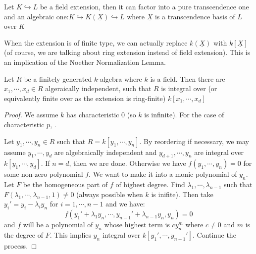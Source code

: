\documentclass{note-eng}
\begin{document}
\begin{corollary}\label{cor:field-extension-decompose}
    Let $K \hookrightarrow L$ be a field extension, then it can factor into a pure transcendence one and an algebraic one:$K \hookrightarrow K(\underline{X}) \hookrightarrow L$ where $\underline{X}$ is a transcendence basis of $L$ over $K$
\end{corollary}

When the extension is of finite type, we can actually replace $k(\underline{X})$ with $k[\underline{X}]$ (of course, we are talking about ring extension instead of field extension). This is an implication of the Noether Normalization Lemma. 

\begin{theorem}
    Let $R$ be a finitely generated $k$-algebra where $k$ is a field. Then there are $x_1, \cdots, x_d \in R$ algeraically independent, such that $R$ is integral over (or equivalently finite over as the extension is ring-finite) $k[x_1, \cdots, x_d]$
\end{theorem}

\begin{proof}
    We assume $k$ has characteristic $0$ (so $k$ is infinite). For the case of characteristic $p$, \TODO.

    Let $y_1, \cdots, y_n \in R$ such that $R = k[y_1, \cdots, y_n]$. By reordering if necessary, we may assume $y_1, \cdots, y_d$ are algebraically independent and $y_{d + 1}, \cdots, y_n$ are integral over $k[y_1, \cdots, y_d]$. If $n = d$, then we are done. Otherwise we have $f(y_1, \cdots, y_n) = 0$ for some non-zero polynomial $f$. We want to make it into a monic polynomial of $y_n$. Let $F$ be the homogeneous part of $f$ of highest degree. Find $\lambda_1, \cdots, \lambda_{n - 1}$ such that $F(\lambda_1, \cdots, \lambda_{n - 1}, 1) \ne 0$ (always possible when $k$ is inifite). Then take $y_i' = y_i - \lambda_i y_n$ for $i = 1, \cdots, n - 1$ and we have:
    $$f(y_1' + \lambda_1 y_n, \cdots, y_{n - 1}' + \lambda_{n - 1} y_{n}, y_n) = 0$$
    and $f$ will be a polynomial of $y_n$ whose highest term is $cy_n^m$ where $c \ne 0$ and $m$ is the degree of $F$. This implies $y_n$ integral over $k[y_1', \cdots, y_{n - 1}']$. Continue the process.
\end{proof}
\end{document}
